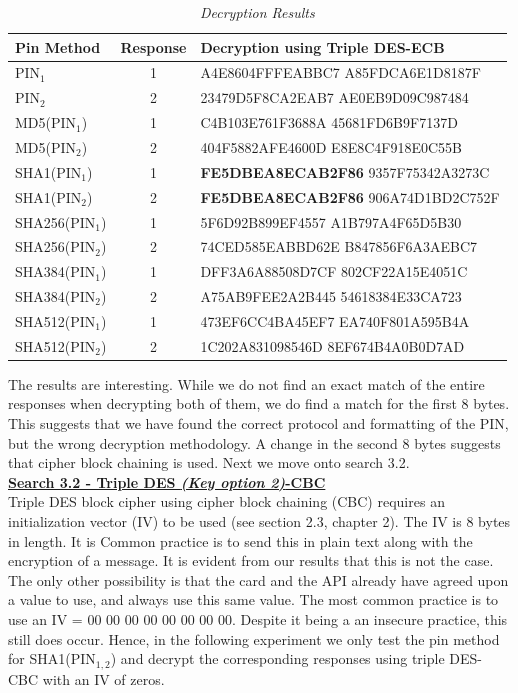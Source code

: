 \documentclass[bsc,frontabs,twoside,singlespacing,parskip,deptreport]{infthesis}     %
\begin{document}
\begin{table}[H]
\begin{tabular}{|l|c|l|}
\hline
Pin Method & Response & Decryption using Triple DES-ECB\\
\hline
PIN$_1$ & 1 & A4E8604FFFEABBC7 A85FDCA6E1D8187F \\
PIN$_2$ & 2 & 23479D5F8CA2EAB7 AE0EB9D09C987484 \\
\hline
MD5(PIN$_1$) & 1 & C4B103E761F3688A 45681FD6B9F7137D \\
MD5(PIN$_2$) & 2 & 404F5882AFE4600D E8E8C4F918E0C55B \\    
\hline
SHA1(PIN$_1$) & 1 & \textbf{FE5DBEA8ECAB2F86} 9357F75342A3273C\\
SHA1(PIN$_2$) & 2 &\textbf{FE5DBEA8ECAB2F86} 906A74D1BD2C752F\\
\hline
SHA256(PIN$_1$) & 1 & 5F6D92B899EF4557 A1B797A4F65D5B30\\
SHA256(PIN$_2$)& 2 & 74CED585EABBD62E B847856F6A3AEBC7 \\
\hline
SHA384(PIN$_1$) & 1 & DFF3A6A88508D7CF 802CF22A15E4051C \\
SHA384(PIN$_2$)& 2 & A75AB9FEE2A2B445 54618384E33CA723 \\
\hline
SHA512(PIN$_1$) & 1 & 473EF6CC4BA45EF7 EA740F801A595B4A \\
SHA512(PIN$_2$)& 2 & 1C202A831098546D 8EF674B4A0B0D7AD \\
\hline
\end{tabular}
\caption{\textit{Decryption Results}}
\end{table}

The results are interesting. While we do not find an exact match of the entire responses when decrypting both of them, we do find a match for the first 8 bytes. This suggests that we have found the correct protocol and formatting of the PIN, but the wrong decryption methodology. A change in the second 8 bytes suggests that cipher block chaining is used. Next we move onto search 3.2.\\

\textbf{\underline{Search 3.2 - Triple DES \textit{(Key option 2)}-CBC}}\\
Triple DES block cipher using cipher block chaining (CBC) requires an initialization vector (IV) to be used (see section 2.3, chapter 2). The IV is 8 bytes in length. It is Common practice is to send this in plain text along with the encryption of a message. It is evident from our results that this is not the case. The only other possibility is that the card and the API already have agreed upon a value to use, and always use this same value. The most common practice is to use an IV = 00 00 00 00 00 00 00 00. Despite it being a an insecure practice, this still does occur. Hence, in the following experiment we only test the pin method for SHA1(PIN$_{1,2}$) and decrypt the corresponding responses using triple DES-CBC with an IV of zeros.
\end{document}
